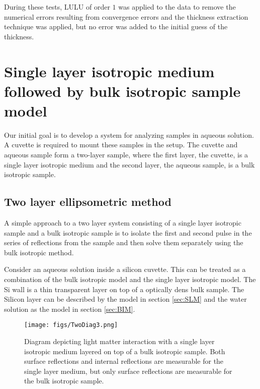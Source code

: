 During these tests, LULU of order $1$ was applied to the data to remove the numerical errors resulting from convergence errors and the thickness extraction technique was applied, but no error was added to the initial guess of the thickness.

\section{Single layer isotropic medium followed by bulk isotropic sample model}
\label{sec:DLM}

Our initial goal is to develop a system for analyzing samples in aqueous solution. A cuvette is required to mount these samples in the setup. The cuvette and aqueous sample form a two-layer sample, where the first layer, the cuvette, is a single layer isotropic medium and the second layer, the aqueous sample, is a bulk isotropic sample.

\subsection{Two layer ellipsometric method}
\label{sub:DLM}

A simple approach to a two layer system consisting of a single layer isotropic sample and a bulk isotropic sample is to isolate the first and second pulse in the series of reflections from the sample and then solve them separately using the bulk isotropic method.

Consider an aqueous solution inside a silicon cuvette.  This can be treated as a combination of the bulk isotropic model and the single layer isotropic model.  The Si wall is a thin transparent layer on top of a optically dens bulk sample. The Silicon layer can be described by the model in section \ref{sec:SLM} and the water solution as the model in section \ref{sec:BIM}.

\begin{figure}[H]
\begin{center}
	 \texttt{[image: figs/TwoDiag3.png]}
	 \caption[Diagram of light-matter interaction with single layer isotropic medium deposited on bulk isotropic sample]{Diagram depicting light matter interaction with a single layer isotropic medium layered on top of a bulk isotropic sample. Both surface reflections and internal reflections are measurable for the single layer medium, but only surface reflections are measurable for the bulk isotropic sample.}
   \label{fig:TwoDiag}
\end{center}
\end{figure}

